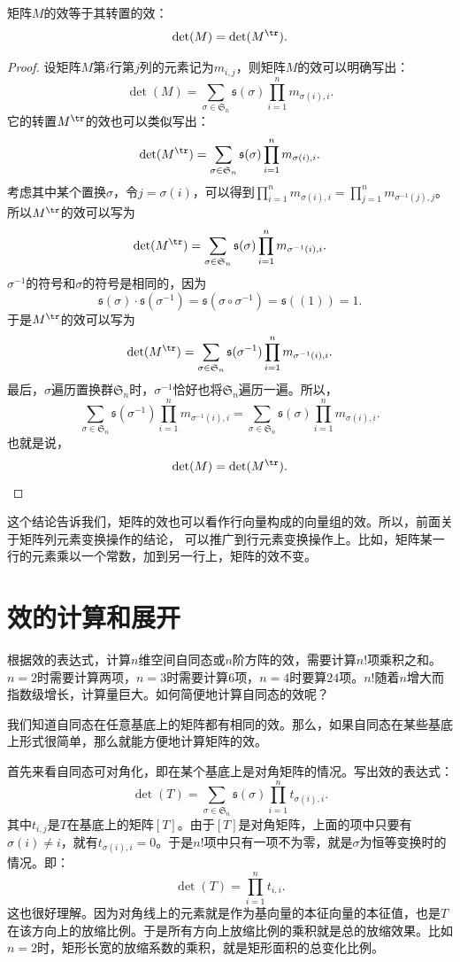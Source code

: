 \documentclass[12pt,UTF8]{ctexbook}
\begin{document}
\begin{pp}\label{pp:10_35}
    矩阵$M$的效等于其转置的效：
    $$ \det(M) = \det(M^{\tr}).$$
\end{pp}
\begin{proof} %
    设矩阵$M$第$i$行第$j$列的元素记为$m_{i,j}$，则矩阵$M$的效可以明确写出：
    $$ \det (M) = \sum_{\sigma\in\mathfrak{S}_n} \mathfrak{s}(\sigma) \prod_{i=1}^n m_{\sigma(i),i}. $$
    它的转置$M^{\tr}$的效也可以类似写出：
    $$ \det (M^{\tr}) = \sum_{\sigma\in\mathfrak{S}_n} \mathfrak{s}(\sigma) \prod_{i=1}^n m_{\sigma(i), i}. $$
    考虑其中某个置换$\sigma$，令$j = \sigma(i)$，可以得到$\prod_{i=1}^n m_{\sigma(i), i} = \prod_{j=1}^n m_{\sigma^{-1}(j), j}$。
    所以$M^{\tr}$的效可以写为
    $$ \det (M^{\tr}) = \sum_{\sigma\in\mathfrak{S}_n} \mathfrak{s}(\sigma) \prod_{i=1}^n m_{\sigma^{-1}(i), i}. $$
    $\sigma^{-1}$的符号和$\sigma$的符号是相同的，因为
    $$ \mathfrak{s}(\sigma) \cdot \mathfrak{s}(\sigma^{-1}) = \mathfrak{s}(\sigma \circ \sigma^{-1}) = \mathfrak{s}((1)) = 1. $$
    于是$M^{\tr}$的效可以写为
    $$ \det (M^{\tr}) = \sum_{\sigma\in\mathfrak{S}_n} \mathfrak{s}(\sigma^{-1}) \prod_{i=1}^n m_{\sigma^{-1}(i), i}. $$
    最后，$\sigma$遍历置换群$\mathfrak{S}_n$时，$\sigma^{-1}$恰好也将$\mathfrak{S}_n$遍历一遍。所以，
    $$ \sum_{\sigma\in\mathfrak{S}_n} \mathfrak{s}(\sigma^{-1}) \prod_{i=1}^n m_{\sigma^{-1}(i), i} = \sum_{\sigma\in\mathfrak{S}_n} \mathfrak{s}(\sigma) \prod_{i=1}^n m_{\sigma(i), i}. $$
    也就是说，
    $$ \det(M) = \det(M^{\tr}).$$
\end{proof}

这个结论告诉我们，矩阵的效也可以看作行向量构成的向量组的效。所以，前面关于矩阵列元素变换操作的结论，
可以推广到行元素变换操作上。比如，矩阵某一行的元素乘以一个常数，加到另一行上，矩阵的效不变。

\section{效的计算和展开}
根据效的表达式，计算$n$维空间自同态或$n$阶方阵的效，需要计算$n!$项乘积之和。$n=2$时需要计算两项，$n=3$时需要计算$6$项，$n=4$时要算$24$项。$n!$随着$n$增大而指数级增长，计算量巨大。如何简便地计算自同态的效呢？

我们知道自同态在任意基底上的矩阵都有相同的效。那么，如果自同态在某些基底上形式很简单，那么就能方便地计算矩阵的效。

首先来看自同态可对角化，即在某个基底上是对角矩阵的情况。写出效的表达式：
$$
\det(T) = \sum_{\sigma\in\mathfrak{S}_n} \mathfrak{s}(\sigma) \prod_{i=1}^n t_{\sigma(i),i}.
$$
其中$t_{i,j}$是$T$在基底上的矩阵$[T]$。由于$[T]$是对角矩阵，上面的项中只要有$\sigma(i)\neq i$，就有$t_{\sigma(i),i} = 0$。于是$n!$项中只有一项不为零，就是$\sigma$为恒等变换时的情况。即：
$$
\det(T) = \prod_{i=1}^n t_{i,i}.
$$
这也很好理解。因为对角线上的元素就是作为基向量的本征向量的本征值，也是$T$在该方向上的放缩比例。于是所有方向上放缩比例的乘积就是总的放缩效果。比如$n=2$时，矩形长宽的放缩系数的乘积，就是矩形面积的总变化比例。
\end{document}
